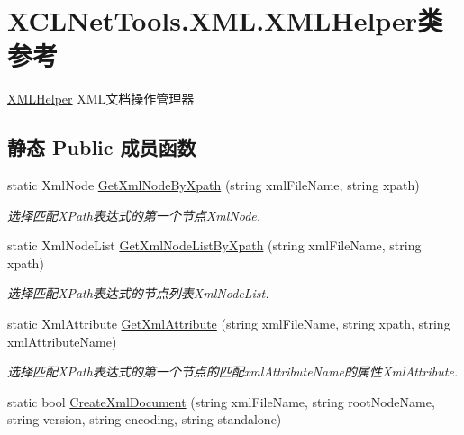 \hypertarget{class_x_c_l_net_tools_1_1_x_m_l_1_1_x_m_l_helper}{}\section{X\+C\+L\+Net\+Tools.\+X\+M\+L.\+X\+M\+L\+Helper类 参考}
\label{class_x_c_l_net_tools_1_1_x_m_l_1_1_x_m_l_helper}


\hyperlink{class_x_c_l_net_tools_1_1_x_m_l_1_1_x_m_l_helper}{X\+M\+L\+Helper} X\+M\+L文档操作管理器  


\subsection*{静态 Public 成员函数}
\begin{DoxyCompactItemize}
\item 
static Xml\+Node \hyperlink{class_x_c_l_net_tools_1_1_x_m_l_1_1_x_m_l_helper_a447b682ec92126215a8fec2000176619}{Get\+Xml\+Node\+By\+Xpath} (string xml\+File\+Name, string xpath)
\begin{DoxyCompactList}\small\item\em 选择匹配\+X\+Path表达式的第一个节点\+Xml\+Node. \end{DoxyCompactList}\item 
static Xml\+Node\+List \hyperlink{class_x_c_l_net_tools_1_1_x_m_l_1_1_x_m_l_helper_a76ff3ba97f764e08467ac33ab90eac14}{Get\+Xml\+Node\+List\+By\+Xpath} (string xml\+File\+Name, string xpath)
\begin{DoxyCompactList}\small\item\em 选择匹配\+X\+Path表达式的节点列表\+Xml\+Node\+List. \end{DoxyCompactList}\item 
static Xml\+Attribute \hyperlink{class_x_c_l_net_tools_1_1_x_m_l_1_1_x_m_l_helper_a9f5d7dcc9d2340c49cc819cbea3c5001}{Get\+Xml\+Attribute} (string xml\+File\+Name, string xpath, string xml\+Attribute\+Name)
\begin{DoxyCompactList}\small\item\em 选择匹配\+X\+Path表达式的第一个节点的匹配xml\+Attribute\+Name的属性\+Xml\+Attribute. \end{DoxyCompactList}\item 
static bool \hyperlink{class_x_c_l_net_tools_1_1_x_m_l_1_1_x_m_l_helper_a41eb1023cd0930834f907aaa7ec3e6c1}{Create\+Xml\+Document} (string xml\+File\+Name, string root\+Node\+Name, string version, string encoding, string standalone)

\end{DoxyCompactItemize}
